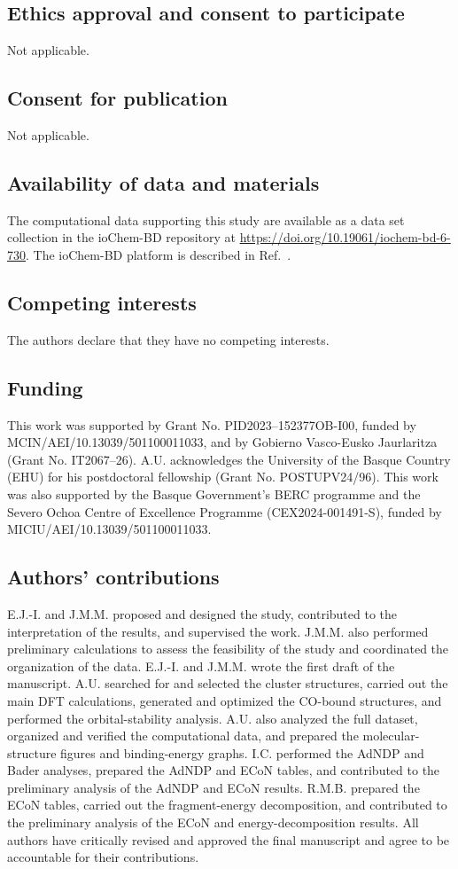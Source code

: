 \documentclass[pdflatex,sn-basic,Numbered]{sn-jnl}
\begin{document}
\subsection*{Ethics approval and consent to participate}
Not applicable.

\subsection*{Consent for publication}
Not applicable.

\subsection*{Availability of data and materials}
The computational data supporting this study are available as a data set collection in the ioChem-BD repository at \url{https://doi.org/10.19061/iochem-bd-6-730}. The ioChem-BD platform is described in Ref.~\cite{alvarez-moreno2015iochemBD}.

\subsection*{Competing interests}
The authors declare that they have no competing interests.

\subsection*{Funding}
This work was supported by Grant No. PID2023--152377OB-I00, funded by MCIN/AEI/10.13039/501100011033, and by Gobierno Vasco-Eusko Jaurlaritza (Grant No. IT2067--26). A.U. acknowledges the University of the Basque Country (EHU) for his postdoctoral fellowship (Grant No. POSTUPV24/96). This work was also supported by the Basque Government's BERC programme and the Severo Ochoa Centre of Excellence Programme (CEX2024-001491-S), funded by MICIU/AEI/10.13039/501100011033.

\subsection*{Authors' contributions}
E.J.-I. and J.M.M. proposed and designed the study, contributed to the interpretation of the results, and supervised the work. J.M.M. also performed preliminary calculations to assess the feasibility of the study and coordinated the organization of the data. E.J.-I. and J.M.M. wrote the first draft of the manuscript. A.U. searched for and selected the cluster structures, carried out the main DFT calculations, generated and optimized the CO-bound structures, and performed the orbital-stability analysis. A.U. also analyzed the full dataset, organized and verified the computational data, and prepared the molecular-structure figures and binding-energy graphs. I.C. performed the AdNDP and Bader analyses, prepared the AdNDP and ECoN tables, and contributed to the preliminary analysis of the AdNDP and ECoN results. R.M.B. prepared the ECoN tables, carried out the fragment-energy decomposition, and contributed to the preliminary analysis of the ECoN and energy-decomposition results. All authors have critically revised and approved the final manuscript and agree to be accountable for their contributions.
\end{document}
